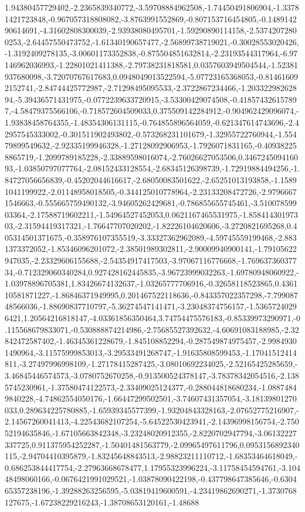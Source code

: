 \documentclass{article}
\begin{document}
1.94380457729402,-2.2365839340772,-3.59708884962508,-1.74450491806904,-1.33781421723848,-0.967057318808082,-3.8763991552869,-0.807153716454805,-0.148914290614691,-4.31602808300039,-2.93938080495701,-1.59290890114158,-2.53742072800253,-2.64457550473752,-1.61340190657477,-2.56899738719021,-0.30028553020426,-1.3192409278135,-3.00601173352838,-0.875504851632814,-2.23193544317964,-6.97146962036993,-1.22801021411388,-2.79738231818581,0.0357603949504544,-1.52381937680098,-3.72070767617683,0.0948049013522594,-5.07723165368053,-0.814616092152741,-2.84744425772987,-2.71298495095533,-2.3722867234466,-1.20332298262894,-5.39436571431975,-0.0772239633720915,-3.53300429074508,-0.418574326157897,-4.58479375566106,-0.718572604509033,0.375509142284912,-0.904962429096074,-1.93838458764355,-1.48354306131115,-0.764855896564059,-0.621347614743696,-2.42957545333002,-0.301511902493802,-0.573268231101679,-1.32955722760944,-1.55479899549632,-2.92335199946328,-1.27128092906953,-1.7926071831165,-0.409382258865719,-1.2099789185228,-2.33889598016074,-2.76026627053506,0.346724509416093,-1.03850797077764,-2.08152433128554,-2.68345126398739,-1.72919884494256,-1.84727056656839,-0.45202044616617,-2.68050083501622,-2.65251013193858,-1.15891041199922,-2.01148958018505,-0.344125010778964,-2.23133208472726,-2.97966671546663,-0.555665759490132,-3.94605262429681,-0.786855655745461,-3.51007859903364,-2.17588719602211,-1.54964527452053,0.0621167465531975,-1.85841430197303,-2.31594419317321,-1.76647707020202,-1.82226104620606,-3.2720821695268,0.405314501371675,-0.358976107355519,-3.33327362962089,-4.59745559199468,-2.8831373372052,-1.85346096201072,-2.38501989302811,-2.90009940900141,-1.79105622947035,-2.23329606155688,-2.54354917417503,-3.97067116776668,-1.76963736037734,-0.712329060340284,0.927428162445835,-3.96723999032263,-1.69780948060922,-1.03978896705381,1.83426674132637,-1.03265777706916,-0.32658118523865,0.436110581871227,-1.86846371949995,0.201467522118636,-0.843357022357298,-7.79908748566036,-1.88690837710797,-5.36274547141471,-3.23048374756157,-1.53657240296421,1.20564216818147,-4.03361856350464,3.74754475576183,-0.85339973290971,-0.115568679833071,-0.530888874214986,-2.75685527392632,-4.60691083188985,-2.32842472587402,-1.46345361228679,-1.845108852294,-0.287549874975457,-2.99849301490964,-3.11575999853013,-3.29533491268747,-1.91635808599453,-1.17041512414811,-3.27497996998109,-1.27178415287425,-3.08010692234025,-2.52165425285659,-3.46845446574573,-3.0780752670258,-0.913500524378147,-3.78378342054516,-2.1385745230961,-1.37580474122573,-2.33409025124377,-0.288044818680234,-1.08874849840228,-4.74862554050176,-1.66447299502501,-3.74607431357054,-3.18139801270033,0.289634225780885,-1.65939345577399,-1.93204843328163,-2.07652775216907,-2.14567260041413,-4.22543682107254,-5.64522530423941,-2.14396998156754,-2.75052194635846,-1.67105663842348,-3.23248020912355,-2.8220702947794,-3.06132227337725,0.911375954252287,-1.50401481563779,-2.09965497611796,0.0953156892340115,-2.94704410395879,-1.83245648843513,-2.98823211110712,-1.68353464618049,-0.686253844417754,-2.27963668678477,1.17955323996224,-3.11758454594761,-3.10448498060166,-0.0676421991029521,-1.03878090422198,-0.437798647385646,-0.630465357238196,-1.39288263256595,-5.03819419600591,-4.23419862690271,-1.3730768127675,-1.67238229216243,-1.38708653120161,-1.48688
\end{document}
